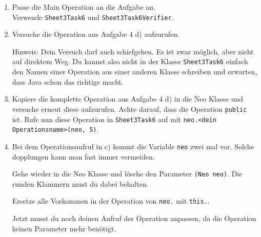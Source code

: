 

\begin{enumerate}
	\item 
		Passe die Main Operation an die Aufgabe an.\\
		Verwende \lstinline{Sheet3Task6} und \lstinline{Sheet3Task6Verifier}.
		
	\item 
		Versuche die Operation aus Aufgabe 4 d) aufzurufen.

		Hinweis: Dein Versuch darf auch schiefgehen.
		Es ist zwar möglich, aber nicht auf direktem Weg.
		Du kannst also nicht in der Klasse \lstinline{Sheet3Task6} einfach den Namen einer Operation aus einer anderen Klasse schreiben und erwarten, dass Java schon das richtige macht.
		
	\item 
		Kopiere die komplette Operation aus Aufgabe 4 d) in die Neo Klasse und versuche erneut diese aufzurufen. 
		Achte darauf, dass die Operation \lstinline{public} ist.
		Rufe nun diese Operation in \lstinline{Sheet3Task6} auf mit \lstinline{neo.<dein Operationsname>(neo, 5)}.
	
	\item
		Bei dem Operationsaufruf in c) kommt die Variable \lstinline{neo} zwei mal vor.
		Solche dopplungen kann man fast immer vermeiden.
		
		Gehe wieder in die Neo Klasse und lösche den Parameter \lstinline{(Neo neo)}.
		Die runden Klammern must du dabei behalten.

		Ersetze alle Vorkommen in der Operation von \lstinline{neo.} mit \lstinline{this.}.

		Jetzt musst du noch deinen Aufruf der Operation anpassen, da die Operation keinen Parameter mehr benötigt.
\end{enumerate}


